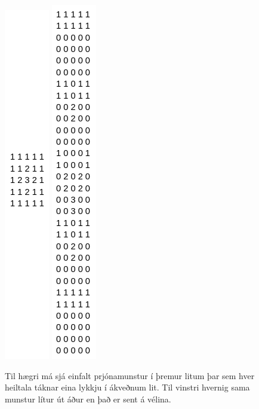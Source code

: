 \begin{figure}
    \centering
    \includegraphics[height=.3\textheight]{myndir/snaeja/litid_prjon_fyrir.png}
    \includegraphics[height=.3\textheight]{myndir/snaeja/litid_prjon_separated.png}
    \caption{Til hægri má sjá einfalt prjónamunstur í þremur litum þar sem hver heiltala táknar eina lykkju í ákveðnum lit. Til vinstri hvernig sama munstur lítur út áður en það er sent á vélina.}
    \label{fig:litid_prjon}
\end{figure}

